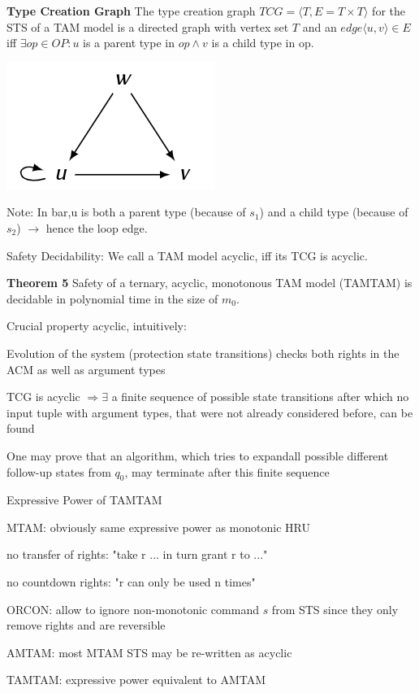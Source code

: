 \documentclass[a4paper]{article}
\renewcommand{\note}[2]{\begin{noteBox} \textbf{#1} #2 \end{noteBox}}
\begin{document}
\begin{multicols}{3}
    \note{Type Creation Graph}{The type creation graph $TCG=\langle T,E=T\times T\rangle$ for the STS of a TAM model is a directed graph with vertex set $T$ and an $edge\langle u,v\rangle \in E$ iff $\exists op\in OP:u$ is a parent type in $op\wedge v$ is a child type in op.}

    \includegraphics[width=.5\linewidth]{Assets/Systemsicherheit-acyclic-tam-example.png}

    Note: In bar,u is both a parent type (because of $s_1$) and a child type (because of $s_2$) $\rightarrow$  hence the loop edge.

    Safety Decidability: We call a TAM model acyclic, iff its TCG is acyclic.

    \note{Theorem 5}{Safety of a ternary, acyclic, monotonous TAM model (TAMTAM) is decidable in polynomial time in the size of $m_0$.}

    Crucial property acyclic, intuitively:
    \begin{itemize*}
        \item Evolution of the system (protection state transitions) checks both rights in the ACM as well as argument types
        \item TCG is acyclic $\Rightarrow\exists$ a finite sequence of possible state transitions after which no input tuple with argument types, that were not already considered before, can be found
        \item One may prove that an algorithm, which tries to expandall possible different follow-up states from $q_0$, may terminate after this finite sequence
    \end{itemize*}

    Expressive Power of TAMTAM
    \begin{itemize*}
        \item MTAM: obviously same expressive power as monotonic HRU
        \begin{itemize*}
            \item no transfer of rights: "take r ... in turn grant r to ..."
            \item no countdown rights: "r can only be used n times"
        \end{itemize*}
        \item ORCON: allow to ignore non-monotonic command $s$ from STS since they only remove rights and are reversible
        \item AMTAM: most MTAM STS may be re-written as acyclic
        \item TAMTAM: expressive power equivalent to AMTAM
    \end{itemize*}


\end{multicols}
\end{document}
